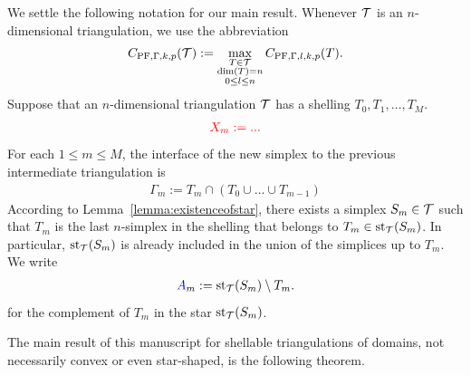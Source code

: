 \documentclass[10pt,a4paper]{article}
\newcommand{\mwl}[1]{{\color{red}#1}}
\begin{document}
We settle the following notation for our main result. 
Whenever ${\mathcal T}$ is an $n$-dimensional triangulation, we use the abbreviation
\begin{align*}
    C_{{\rm PF},\Gamma,k,p}({\mathcal T}) 
    :=
    \max\limits_{ \substack{ T \in {\mathcal T} \\ \dim(T)=n \\ 0 \leq l \leq n } }
    C_{{\rm PF},\Gamma,l,k,p}(T)
    .
\end{align*}
Suppose that an $n$-dimensional triangulation ${\mathcal T}$ has a shelling $T_{0}, T_{1}, \dots, T_{M}$. 
\begin{align*}
    \mwl{X_{m} := ...}
\end{align*}
For each $1 \leq m \leq M$, the interface of the new simplex to the previous intermediate triangulation is 
\begin{align*}
    \Gamma_{m} := T_{m} \cap \left( T_{0} \cup \dots \cup T_{m-1} \right)
\end{align*}
According to Lemma~\ref{lemma:existenceofstar}, 
there exists a simplex $S_{m} \in {\mathcal T}$ 
such that $T_{m}$ is the last $n$-simplex in the shelling that belongs to $T_{m} \in \operatorname{st}_{{\mathcal T}}(S_{m})$.
In particular, $\operatorname{st}_{{\mathcal T}}(S_{m})$ is already included in the union of the simplices up to $T_m$. 
We write 
\begin{align*}
    {\color{blue}A}_{m} := \operatorname{st}_{{\mathcal T}}(S_{m}) \setminus T_{m}.
\end{align*}
for the complement of $T_{m}$ in the star $\operatorname{st}_{{\mathcal T}}(S_{m})$. 

The main result of this manuscript for shellable triangulations of domains, not necessarily convex or even star-shaped, is the following theorem. 
\end{document}
